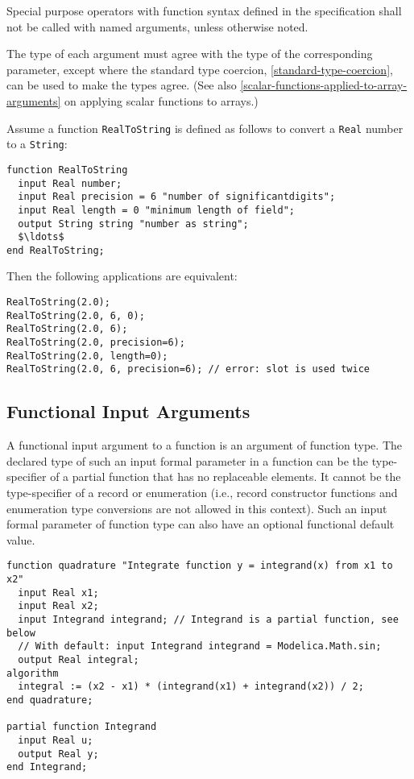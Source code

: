 Special purpose operators with function syntax defined in the
specification shall not be called with named arguments, unless otherwise
noted.

The type of each argument must agree with the type of the corresponding
parameter, except where the standard type coercion, \cref{standard-type-coercion}, can be used to make
the types agree. (See also \cref{scalar-functions-applied-to-array-arguments} on applying scalar functions
to arrays.)

\begin{example}
Assume a function \lstinline!RealToString! is defined as follows to
convert a \lstinline!Real! number to a \lstinline!String!:
\begin{lstlisting}[language=modelica]
function RealToString
  input Real number;
  input Real precision = 6 "number of significantdigits";
  input Real length = 0 "minimum length of field";
  output String string "number as string";
  $\ldots$
end RealToString;
\end{lstlisting}
Then the following applications are equivalent:
\begin{lstlisting}[language=modelica]
RealToString(2.0);
RealToString(2.0, 6, 0);
RealToString(2.0, 6);
RealToString(2.0, precision=6);
RealToString(2.0, length=0);
RealToString(2.0, 6, precision=6); // error: slot is used twice
\end{lstlisting}
\end{example}

\subsection{Functional Input Arguments}\label{functional-input-arguments-to-functions}

A functional input argument to a function is an argument of function type.
The declared type of such an input formal parameter in a function can be the type-specifier of a partial function that has no replaceable elements.
It cannot be the type-specifier of a record or enumeration (i.e., record constructor functions and enumeration type conversions are not allowed in this context).
Such an input formal parameter of function type can also have an optional functional default value.

\begin{example}
\begin{lstlisting}[language=modelica]
function quadrature "Integrate function y = integrand(x) from x1 to x2"
  input Real x1;
  input Real x2;
  input Integrand integrand; // Integrand is a partial function, see below
  // With default: input Integrand integrand = Modelica.Math.sin;
  output Real integral;
algorithm
  integral := (x2 - x1) * (integrand(x1) + integrand(x2)) / 2;
end quadrature;

partial function Integrand
  input Real u;
  output Real y;
end Integrand;
\end{lstlisting}
\end{example}

